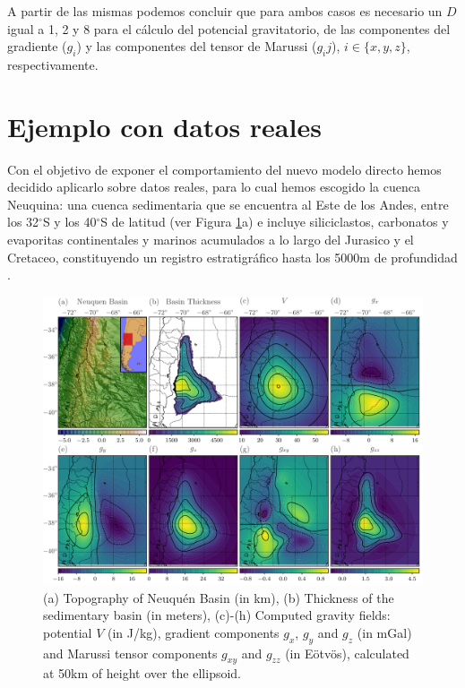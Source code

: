 \documentclass[a4paper,10pt]{article}
\begin{document}
A partir de las mismas podemos concluir que para ambos casos es necesario un $D$ igual a 1, 2 y 8 para el cálculo del potencial gravitatorio, de las componentes del gradiente ($g_i$) y las componentes del tensor de Marussi ($g_ij$), $i \in \{ x, y, z\}$, respectivamente.




\section{Ejemplo con datos reales}

Con el objetivo de exponer el comportamiento del nuevo modelo directo hemos decidido aplicarlo sobre datos reales, para lo cual hemos escogido la cuenca Neuquina: una cuenca sedimentaria que se encuentra al Este de los Andes, entre los 32$^\circ$S y los 40$^\circ$S de latitud (ver Figura \ref{fig:neuquen-basin}a) e incluye siliciclastos, carbonatos y evaporitas continentales y marinos acumulados a lo largo del Jurasico y el Cretaceo, constituyendo un registro estratigráfico hasta los 5000m de profundidad \citep{Howell2005}.


\begin{figure}[b!]
\centering
\includegraphics[width=0.975\linewidth]{../manuscript/figures/neuquen-basin.pdf}
\caption{(a) Topography of Neuqu\'en Basin (in km),
         (b) Thickness of the sedimentary basin (in meters),
         (c)-(h) Computed gravity fields: potential $V$ (in J/kg), gradient components $g_x$, $g_y$ and $g_z$ (in mGal) and Marussi tensor components $g_{xy}$ and $g_{zz}$ (in Eötvös), calculated at 50km of height over the ellipsoid.}
\label{fig:neuquen-basin}
\end{figure}
\end{document}
